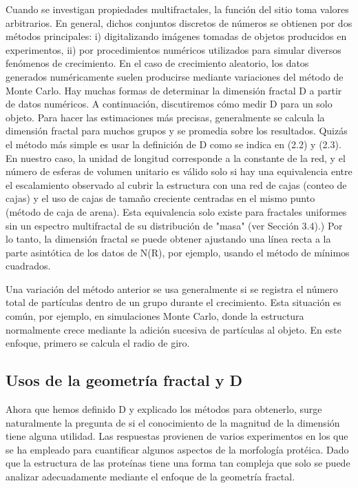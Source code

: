 \documentclass[11pt]{article}
\begin{document}
Cuando se investigan propiedades multifractales, la función del sitio toma valores arbitrarios. En general, dichos conjuntos discretos de números se obtienen por dos métodos principales: i) digitalizando imágenes tomadas de objetos producidos en experimentos, ii) por procedimientos numéricos utilizados para simular diversos fenómenos de crecimiento. En el caso de crecimiento aleatorio, los datos generados numéricamente suelen producirse mediante variaciones del método de Monte Carlo. Hay muchas formas de determinar la dimensión fractal D a partir de datos numéricos. A continuación, discutiremos cómo medir D para un solo objeto. Para hacer las estimaciones más precisas, generalmente se calcula la dimensión fractal para muchos grupos y se promedia sobre los resultados. Quizás el método más simple es usar la definición de  D como se indica en (2.2) y (2.3). En nuestro caso, la unidad de longitud corresponde a la constante de la red, y el número de esferas de volumen unitario es válido solo si hay una equivalencia entre el escalamiento observado al cubrir la estructura con una red de cajas (conteo de cajas) y el uso de cajas de tamaño creciente centradas en el mismo punto (método de caja de arena). Esta equivalencia solo existe para fractales uniformes sin un espectro multifractal de su distribución de "masa" (ver Sección 3.4).) Por lo tanto, la dimensión fractal se puede obtener ajustando una línea recta a la parte asintótica de los datos de  N(R), por ejemplo, usando el método de mínimos cuadrados.

Una variación del método anterior se usa generalmente si se registra el número total de partículas dentro de un grupo durante el crecimiento. Esta situación es común, por ejemplo, en simulaciones Monte Carlo, donde la estructura normalmente crece mediante la adición sucesiva de partículas al objeto. En este enfoque, primero se calcula el radio de giro.

\subsection{Usos de la geometría fractal y D}

Ahora que hemos definido D y explicado los métodos para obtenerlo, surge naturalmente la pregunta de si el conocimiento de la magnitud de la dimensión tiene alguna utilidad. Las respuestas provienen de varios experimentos en los que se ha empleado para cuantificar algunos aspectos de la morfología protéica. Dado que la estructura de las proteínas tiene una forma tan compleja que solo se puede analizar adecuadamente mediante el enfoque de la geometría fractal. 
\end{document}
